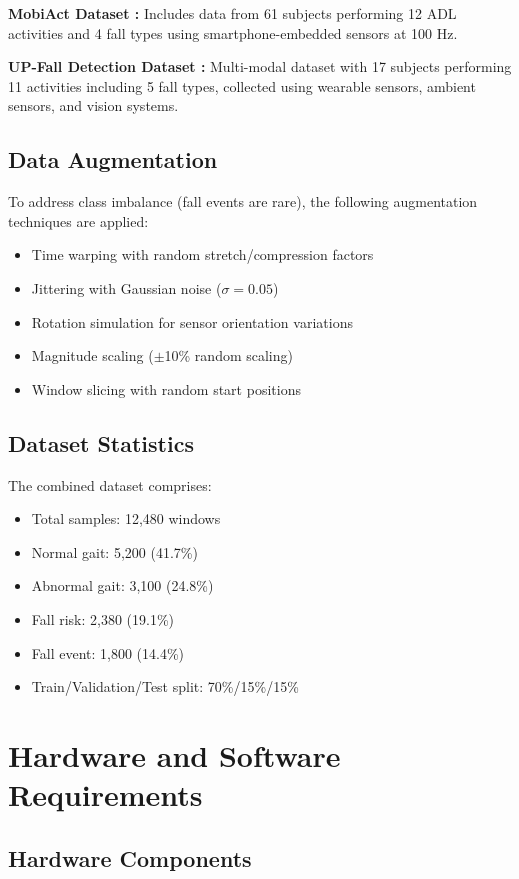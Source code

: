 \documentclass[conference]{IEEEtran}
\begin{document}
\textbf{MobiAct Dataset \cite{mobiact}:} Includes data from 61 subjects performing 12 ADL activities and 4 fall types using smartphone-embedded sensors at 100 Hz.

\textbf{UP-Fall Detection Dataset \cite{upfall}:} Multi-modal dataset with 17 subjects performing 11 activities including 5 fall types, collected using wearable sensors, ambient sensors, and vision systems.

\subsection{Data Augmentation}

To address class imbalance (fall events are rare), the following augmentation techniques are applied:
\begin{itemize}
    \item Time warping with random stretch/compression factors
    \item Jittering with Gaussian noise ($\sigma = 0.05$)
    \item Rotation simulation for sensor orientation variations
    \item Magnitude scaling ($\pm$10\% random scaling)
    \item Window slicing with random start positions
\end{itemize}

\subsection{Dataset Statistics}

The combined dataset comprises:
\begin{itemize}
    \item Total samples: 12,480 windows
    \item Normal gait: 5,200 (41.7\%)
    \item Abnormal gait: 3,100 (24.8\%)
    \item Fall risk: 2,380 (19.1\%)
    \item Fall event: 1,800 (14.4\%)
    \item Train/Validation/Test split: 70\%/15\%/15\%
\end{itemize}

\section{Hardware and Software Requirements}

\subsection{Hardware Components}
\end{document}
